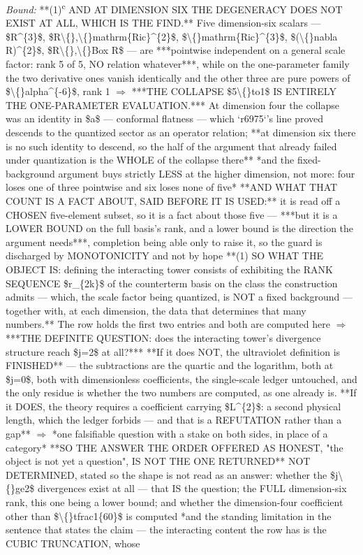 \begin{description}
 \emph{Bound:}  **(1)\textsuperscript{c} AND AT DIMENSION SIX THE DEGENERACY DOES NOT EXIST AT ALL, WHICH IS THE FIND.** Five dimension-six scalars --- \$R\textasciicircum{}\{3\}\$, \$R\textbackslash\{\},\textbackslash\{\}mathrm\{Ric\}\textasciicircum{}\{2\}\$, \$\textbackslash\{\}mathrm\{Ric\}\textasciicircum{}\{3\}\$, \$(\textbackslash\{\}nabla R)\textasciicircum{}\{2\}\$, \$R\textbackslash\{\},\textbackslash\{\}Box R\$ --- are ***pointwise independent on a general scale factor: rank 5 of 5, NO relation whatever***, while on the one-parameter family the two derivative ones vanish identically and the other three are pure powers of \$\textbackslash\{\}alpha\textasciicircum{}\{-6\}\$, rank 1 \ensuremath{\Rightarrow} ***THE COLLAPSE \$5\textbackslash\{\}to1\$ IS ENTIRELY THE ONE-PARAMETER EVALUATION.*** At dimension four the collapse was an identity in \$a\$ --- conformal flatness --- which `r6975`'s line proved descends to the quantized sector as an operator relation; **at dimension six there is no such identity to descend, so the half of the argument that already failed under quantization is the WHOLE of the collapse there**  *and the fixed-background argument buys strictly LESS at the higher dimension, not more: four loses one of three pointwise and six loses none of five*  **AND WHAT THAT COUNT IS A FACT ABOUT, SAID BEFORE IT IS USED:** it is read off a CHOSEN five-element subset, so it is a fact about those five --- ***but it is a LOWER BOUND on the full basis's rank, and a lower bound is the direction the argument needs***, completion being able only to raise it, so the guard is discharged by MONOTONICITY and not by hope  **(1) SO WHAT THE OBJECT IS: defining the interacting tower consists of exhibiting the RANK SEQUENCE \$r\_\{2k\}\$ of the counterterm basis on the class the construction admits --- which, the scale factor being quantized, is NOT a fixed background --- together with, at each dimension, the data that determines that many numbers.** The row holds the first two entries and both are computed here \ensuremath{\Rightarrow} ***THE DEFINITE QUESTION: does the interacting tower's divergence structure reach \$j=2\$ at all?*** **If it does NOT, the ultraviolet definition is FINISHED** --- the subtractions are the quartic and the logarithm, both at \$j=0\$, both with dimensionless coefficients, the single-scale ledger untouched, and the only residue is whether the two numbers are computed, as one already is. **If it DOES, the theory requires a coefficient carrying \$L\textasciicircum{}\{2\}\$: a second physical length, which the ledger forbids --- and that is a REFUTATION rather than a gap** \ensuremath{\Rightarrow} *one falsifiable question with a stake on both sides, in place of a category*  **SO THE ANSWER THE ORDER OFFERED AS HONEST, "the object is not yet a question", IS NOT THE ONE RETURNED**   NOT DETERMINED, stated so the shape is not read as an answer: whether the \$j\textbackslash\{\}ge2\$ divergences exist at all --- that IS the question; the FULL dimension-six rank, this one being a lower bound; and whether the dimension-four coefficient other than \$\textbackslash\{\}tfrac1\{60\}\$ is computed  *and the standing limitation in the sentence that states the claim --- the interacting content the row has is the CUBIC TRUNCATION, whose 
\end{description}
